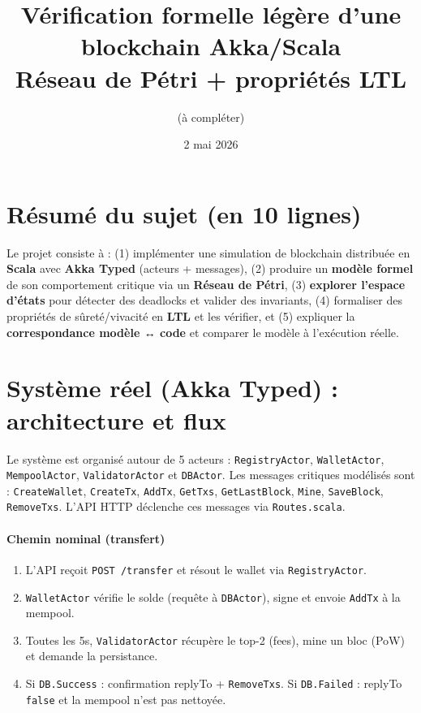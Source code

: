\documentclass[11pt,a4paper]{article}
\title{Vérification formelle légère d'une blockchain Akka/Scala\\\large Réseau de Pétri + propriétés LTL}
\author{(à compléter)}
\date{2 mai 2026}
\begin{document}
\maketitle

\section{Résumé du sujet (en 10 lignes)}

Le projet consiste à : (1) implémenter une simulation de blockchain distribuée en \textbf{Scala} avec \textbf{Akka Typed} (acteurs + messages), (2) produire un \textbf{modèle formel} de son comportement critique via un \textbf{Réseau de Pétri}, (3) \textbf{explorer l'espace d'états} pour détecter des deadlocks et valider des invariants, (4) formaliser des propriétés de sûreté/vivacité en \textbf{LTL} et les vérifier, et (5) expliquer la \textbf{correspondance modèle ↔ code} et comparer le modèle à l'exécution réelle.

\section{Système réel (Akka Typed) : architecture et flux}\label{sec:akka}

Le système est organisé autour de 5 acteurs : \texttt{RegistryActor}, \texttt{WalletActor}, \texttt{MempoolActor}, \texttt{ValidatorActor} et \texttt{DBActor}. Les messages critiques modélisés sont : \texttt{CreateWallet}, \texttt{CreateTx}, \texttt{AddTx}, \texttt{GetTxs}, \texttt{GetLastBlock}, \texttt{Mine}, \texttt{SaveBlock}, \texttt{RemoveTxs}. L'API HTTP déclenche ces messages via \texttt{Routes.scala}.

\paragraph{Chemin nominal (transfert)}
\begin{enumerate}[leftmargin=*]
  \item L'API reçoit \texttt{POST /transfer} et résout le wallet via \texttt{RegistryActor}.
  \item \texttt{WalletActor} vérifie le solde (requête à \texttt{DBActor}), signe et envoie \texttt{AddTx} à la mempool.
  \item Toutes les 5s, \texttt{ValidatorActor} récupère le top-2 (fees), mine un bloc (PoW) et demande la persistance.
  \item Si \texttt{DB.Success} : confirmation replyTo + \texttt{RemoveTxs}. Si \texttt{DB.Failed} : replyTo \texttt{false} et la mempool n'est pas nettoyée.
\end{enumerate}
\end{document}
